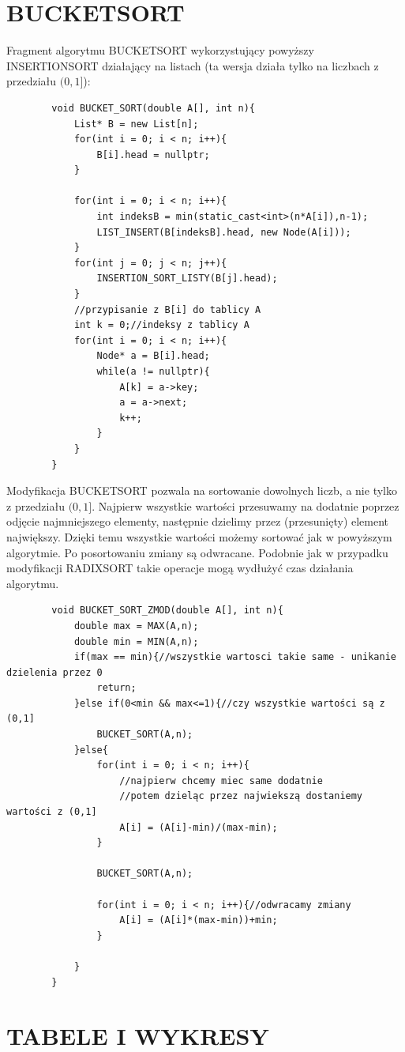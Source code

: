 \documentclass{article}
\begin{document}
	\section*{BUCKETSORT}
	Fragment algorytmu BUCKETSORT wykorzystujący powyższy INSERTIONSORT działający na listach (ta wersja działa tylko na liczbach z przedziału $(0,1]$):
	\begin{verbatim}
		void BUCKET_SORT(double A[], int n){
			List* B = new List[n];
			for(int i = 0; i < n; i++){
				B[i].head = nullptr;
			}
			
			for(int i = 0; i < n; i++){
				int indeksB = min(static_cast<int>(n*A[i]),n-1);
				LIST_INSERT(B[indeksB].head, new Node(A[i]));
			}
			for(int j = 0; j < n; j++){
				INSERTION_SORT_LISTY(B[j].head);
			}
			//przypisanie z B[i] do tablicy A
			int k = 0;//indeksy z tablicy A
			for(int i = 0; i < n; i++){
				Node* a = B[i].head;
				while(a != nullptr){
					A[k] = a->key;
					a = a->next;
					k++;
				}
			}
		}
	\end{verbatim}
	Modyfikacja BUCKETSORT pozwala na sortowanie dowolnych liczb, a nie tylko z przedziału $(0,1]$. Najpierw wszystkie wartości przesuwamy na dodatnie poprzez odjęcie najmniejszego elementy, następnie dzielimy przez (przesunięty) element największy. Dzięki temu wszystkie wartości możemy sortować jak w powyższym algorytmie. Po posortowaniu zmiany są odwracane. Podobnie jak w przypadku modyfikacji RADIXSORT takie operacje mogą wydłużyć czas działania algorytmu.
	\begin{verbatim}
		void BUCKET_SORT_ZMOD(double A[], int n){
			double max = MAX(A,n);
			double min = MIN(A,n);
			if(max == min){//wszystkie wartosci takie same - unikanie dzielenia przez 0
				return;
			}else if(0<min && max<=1){//czy wszystkie wartości są z (0,1]
				BUCKET_SORT(A,n); 
			}else{
				for(int i = 0; i < n; i++){
					//najpierw chcemy miec same dodatnie 
					//potem dzieląc przez najwiekszą dostaniemy wartości z (0,1]
					A[i] = (A[i]-min)/(max-min);
				}
				
				BUCKET_SORT(A,n);
				
				for(int i = 0; i < n; i++){//odwracamy zmiany
					A[i] = (A[i]*(max-min))+min;
				}
				
			}
		}
	\end{verbatim}
	\section*{TABELE I WYKRESY}
\end{document}
